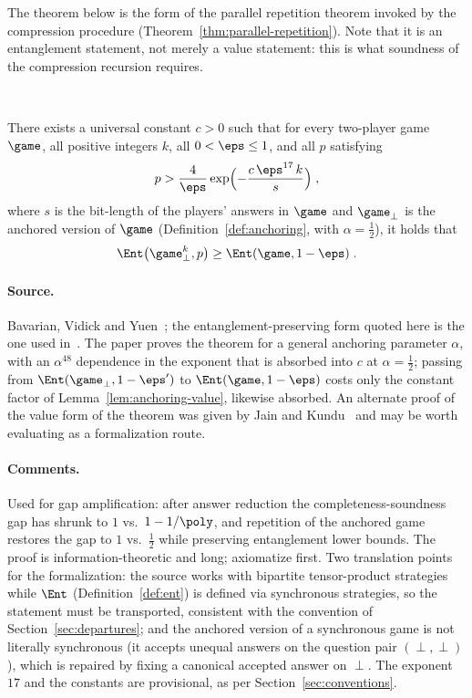 The theorem below is the form of the parallel repetition theorem invoked by the
compression procedure (Theorem~\ref{thm:parallel-repetition}). Note that it is an
entanglement statement, not merely a value statement: this is what soundness of the
compression recursion requires.

\effortHard\ \qlib

\begin{theorem}
\label{thm:bvy}
There exists a universal constant $c > 0$ such that for every two-player game $\game$,
all positive integers $k$, all $0 < \eps \leq 1$, and all $p$ satisfying
\begin{equation*}
  p > \frac{4}{\eps} \exp\Bigl( - \frac{c\, \eps^{17}\, k}{s} \Bigr)\;,
\end{equation*}
where $s$ is the bit-length of the players' answers in $\game$ and $\game_\perp$ is
the anchored version of $\game$ (Definition~\ref{def:anchoring}, with $\alpha =
\frac12$), it holds that
\begin{equation*}
  \Ent\bigl( \game_\perp^{k}, p \bigr) \geq \Ent(\game, 1 - \eps)\;.
\end{equation*}
\end{theorem}

\paragraph{Source.} Bavarian, Vidick and Yuen~\cite{BVY17}; the entanglement-preserving
form quoted here is the one used in~\cite[Section 10]{JNVWY20}. The paper proves the
theorem for a general anchoring parameter $\alpha$, with an $\alpha^{48}$ dependence in
the exponent that is absorbed into $c$ at $\alpha = \frac12$; passing from
$\Ent(\game_\perp, 1 - \eps')$ to $\Ent(\game, 1 - \eps)$ costs only the constant
factor of Lemma~\ref{lem:anchoring-value}, likewise absorbed. An alternate proof of
the value form of the theorem was given by Jain and Kundu~\cite{JK20} and may be worth
evaluating as a formalization route.

\paragraph{Comments.} Used for gap amplification: after answer reduction the
completeness-soundness gap has shrunk to $1$ vs.\ $1 - 1/\poly$, and repetition of the
anchored game restores the gap to $1$ vs.\ $\frac12$ while preserving entanglement
lower bounds. The proof is information-theoretic and long; axiomatize first. Two
translation points for the formalization: the source works with bipartite
tensor-product strategies while $\Ent$ (Definition~\ref{def:ent}) is defined via
synchronous strategies, so the statement must be transported, consistent with the
convention of Section~\ref{sec:departures}; and the anchored version of a synchronous
game is not literally synchronous (it accepts unequal answers on the question pair
$(\perp, \perp)$), which is repaired by fixing a canonical accepted answer on $\perp$.
The exponent $17$ and the constants are provisional, as per
Section~\ref{sec:conventions}.

